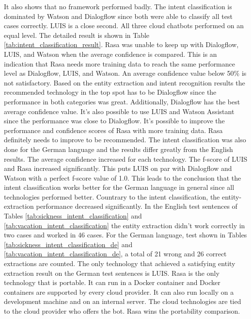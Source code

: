 It also shows that no framework performed badly.
The intent classification is dominated by Watson and Dialogflow since 
both were able to classify all test cases correctly.
LUIS is a close second.
All three cloud chatbots performed on an equal level.
The detailed result is shown in Table \ref{tab:intent_classification_result}.
Rasa was unable to keep up with Dialogflow, LUIS, and Watson when the 
average confidence is compared.
This is an indication that Rasa needs more training data to 
reach the same performance level as Dialogflow, LUIS, and Watson.
An average confidence value below 50\% is not satisfactory.
Based on the entity extraction and intent recognition results
the recommended technology in the top spot has to be Dialogflow
since the performance in both categories was great.
Additionally, Dialogflow has the best average confidence value.
It's also possible to use LUIS and Watson Assistant since the performance was close to Dialogflow.
It's possible to improve the performance and confidence scores of Rasa with more training data.
Rasa definitely needs to improve to be recommended.
The intent classification was also done for the German language and the results differ greatly from the 
English results.
The average confidence increased for each technology.
The f-score of LUIS and Rasa increased significantly. 
This puts LUIS on par with Dialogflow and Watson with a perfect f-score value of 1.0.
This leads to the conclusion that the intent classification works better for the German 
language in general since all technologies performed better.
Countrary to the intent classification, the entity-extraction performance decreased significantly.
In the English test sentences of Tables \ref{tab:sickness_intent_classification} and \ref{tab:vacation_intent_classification}
the entity extraction didn't work correctly in two cases and worked in 46 cases.
For the German language, test shown in Tables \ref{tab:sickness_intent_classification_de} and \ref{tab:vacation_intent_classification_de},
a total of 21 wrong and 26 correct extractions are counted.
The only technology that achieved a satisfying entity extraction result on the German test sentences is LUIS.
Rasa is the only technology that is portable.
It can run in a Docker container and Docker containers are supported by every 
cloud provider.
It can also run locally on a development machine and on an internal server.
The cloud technologies are tied to the cloud provider who offers the bot.
Rasa wins the portability comparison.
